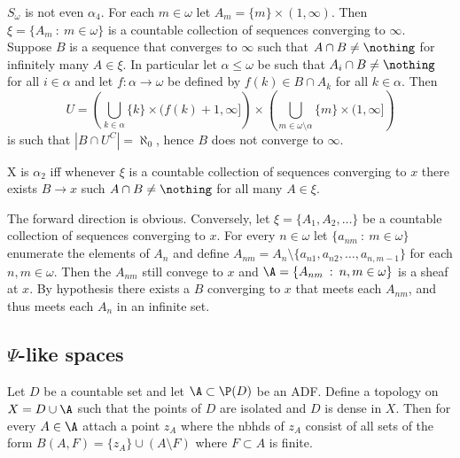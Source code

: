 \documentclass{article}
\begin{document}
\begin{exam}
    \(S_{\omega}\) is not even \(\alpha_4\). For each \(m \in \omega\) let \(A_m = \{m\} \times (1, \infty)\). Then \(\xi = \{A_m \: : \: m \in \omega\}\) is a countable collection of sequences converging to \(\infty\). Suppose \(B\) is a sequence that converges to \(\infty\) such that \(A\cap B \neq \nothing\) for infinitely many \(A \in \xi\). In particular let \(\alpha \leq \omega\) be such that \(A_i \cap B \neq \nothing\) for all \(i \in \alpha\) and let \(f:\alpha \to \omega\) be defined by \(f(k) \in B \cap A_k\) for all \(k \in \alpha\). Then 
    \[
    U = \left(\bigcup_{k \in \alpha} \{k\} \times (f(k) + 1, \infty]\right)\times \left(\bigcup_{m \in \omega\setminus\alpha} \{m\} \times (1, \infty]\right)\] 
    is such that \(|B \cap U^C| = \aleph_0\), hence \(B\) does not converge to \(\infty\). 

\end{exam}

\begin{exercise}{\label{var_alpha2}}
    X is \(\alpha_2\) iff whenever \(\xi\) is a countable collection of sequences converging to \(x\) there exists \(B \to x\) such \(A \cap B \neq \nothing\) for all many \(A \in \xi\).
\end{exercise}
\begin{soln}
    The forward direction is obvious. Conversely, let \(\xi =\{A_1, A_2, \dots\}\) be a countable collection of sequences converging to \(x\). For every \(n\in \omega\) let \(\{a_{nm} \: : \: m \in \omega\}\) enumerate the elements of \(A_n\) and define \(A_{nm} = A_n \setminus \{a_{n1}, a_{n2}, \dots, a_{n,m-1}\}\) for each \(n,m \in \omega\). Then the \(A_{nm}\) still convege to \(x\) and  \(\A = \{A_{nm} \: : \: n,m \in \omega \}\) is a sheaf at \(x\). By hypothesis there exists a \(B\) converging to \(x\) that meets each \(A_{nm}\), and thus meets each \(A_n\) in an infinite set.
\end{soln}

\subsection{\(\Psi\)-like spaces}

\begin{defn}
    Let \(D\) be a countable set and let \(\A \subset \P(D)\) be an ADF. Define a topology on \(X = D \cup \A\) such that the points of \(D\) are isolated and \(D\) is dense in \(X\). Then for every \(A \in \A\) attach a point \(z_A\) where the nbhds of \(z_A\) consist of all sets of the form \(B(A, F) = \{z_A\} \cup (A \setminus F)\) where \(F \subset A\) is finite.
\end{defn}
\end{document}
